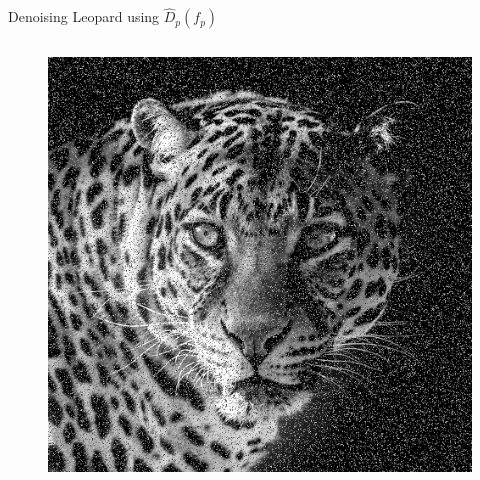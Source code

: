 \documentclass[mathserif]{beamer}
\begin{document}
\begin{frame}{Denoising Leopard using $\hat D_p(f_p)$ }
\begin{columns}
\begin{column}{0.4\textwidth}
\begin{figure}[h]
                \includegraphics[width=.99\textwidth]{../testimages/leopard/leopard_500_20percent.png}
            \end{figure}
        \end{column}
    \end{columns}
\end{frame}
\end{document}
